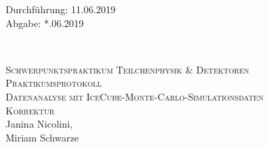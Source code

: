 



\begin{titlepage}
  \begin{flushleft}
 Durchführung: 11.06.2019\\
 Abgabe: *.06.2019
  \end{flushleft}


\HRule\\[1,0cm]

 \begin{center}


  \textsc{\Large Schwerpunktspraktikum Teilchenphysik \& Detektoren}\\[1.5cm]
  \textsc{\LARGE Praktikumsprotokoll}\\[1.5cm]
\textsc{\huge Datenanalyse mit IceCube-Monte-Carlo-Simulationsdaten}  \\[1cm]
\textsc{Korrektur} \\[5,5cm]

Janina Nicolini\footnotemark[1], \\
Miriam Schwarze\footnotemark[2] \\[1,0cm]



 \end{center}
\HRule

 \vfill

\end{titlepage}






\printbibliography


